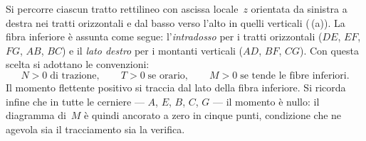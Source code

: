 Si percorre ciascun tratto rettilineo con ascissa locale~$z$
orientata da sinistra a destra nei tratti orizzontali e dal
basso verso l'alto in quelli verticali (\,(a)). La fibra inferiore
è assunta come segue: l'\emph{intradosso} per i tratti
orizzontali ($DE$, $EF$, $FG$, $AB$, $BC$) e il \emph{lato
	destro} per i montanti verticali ($AD$, $BF$, $CG$).
Con questa scelta si adottano le convenzioni:
\[
N > 0 \;\text{di trazione},
\qquad
T > 0 \;\text{se orario},
\qquad
M > 0 \;\text{se tende le fibre inferiori}.
\]
Il momento flettente positivo si traccia dal lato della
fibra inferiore. Si ricorda infine che in tutte le
cerniere --- $A$, $E$, $B$, $C$, $G$ --- il momento è
nullo: il diagramma di~$M$ è quindi ancorato a zero in
cinque punti, condizione che ne agevola sia il tracciamento
sia la verifica.


